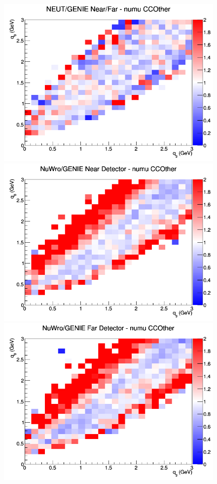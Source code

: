 \begin{figure}[h]
\endminipage
{}
\includegraphics[width=\linewidth]{eff_q0_q3/GAr/ratios/CCOther_NEUT_GENIE_numu_NF_q3_q0.png}
\endminipage
\newline
{}
\includegraphics[width=\linewidth]{eff_q0_q3/GAr/ratios/CCOther_NuWro_GENIE_numu_near_q3_q0.png}
\endminipage
{}
\includegraphics[width=\linewidth]{eff_q0_q3/GAr/ratios/CCOther_NuWro_GENIE_numu_far_q3_q0.png}

\end{figure}
